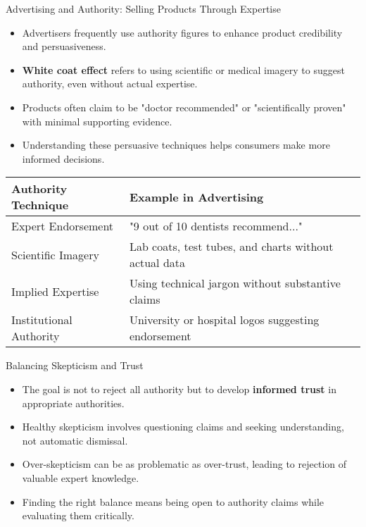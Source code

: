\documentclass{beamer}
\begin{document}
\begin{frame}{Advertising and Authority: Selling Products Through Expertise}
    \begin{itemize}
        \item Advertisers frequently use authority figures to enhance product credibility and persuasiveness.
        \item \textbf{White coat effect} refers to using scientific or medical imagery to suggest authority, even without actual expertise.
        \item Products often claim to be "doctor recommended" or "scientifically proven" with minimal supporting evidence.
        \item Understanding these persuasive techniques helps consumers make more informed decisions.
    \end{itemize}
    
    \begin{table}
        \centering
        \begin{tabular}{|l|p{7cm}|}
            \hline
            \textbf{Authority Technique} & \textbf{Example in Advertising} \\
            \hline
            Expert Endorsement & "9 out of 10 dentists recommend..." \\
            Scientific Imagery & Lab coats, test tubes, and charts without actual data \\
            Implied Expertise & Using technical jargon without substantive claims \\
            Institutional Authority & University or hospital logos suggesting endorsement \\
            \hline
        \end{tabular}
    \end{table}
\end{frame}

\begin{frame}{Balancing Skepticism and Trust}
    \begin{itemize}
        \item The goal is not to reject all authority but to develop \textbf{informed trust} in appropriate authorities.
        \item Healthy skepticism involves questioning claims and seeking understanding, not automatic dismissal.
        \item Over-skepticism can be as problematic as over-trust, leading to rejection of valuable expert knowledge.
        \item Finding the right balance means being open to authority claims while evaluating them critically.
    \end{itemize}
    
\end{frame}
\end{document}
